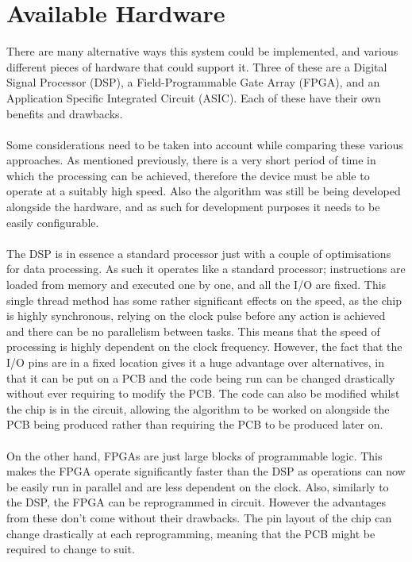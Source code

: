 \section{Available Hardware}
There are many alternative ways this system could be implemented, and various different pieces of hardware that could support it.
Three of these are a Digital Signal Processor (DSP), a Field-Programmable Gate Array (FPGA), and an Application Specific Integrated Circuit (ASIC).
Each of these have their own benefits and drawbacks.
\\
\\
Some considerations need to be taken into account while comparing these various approaches.
As mentioned previously, there is a very short period of time in which the processing can be achieved, therefore the device must be able to operate at a suitably high speed.
Also the algorithm was still be being developed alongside the hardware, and as such for development purposes it needs to be easily configurable.
\\
\\
The DSP is in essence a standard processor just with a couple of optimisations for data processing. 
As such it operates like a standard processor; instructions are loaded from memory and executed one by one, and all the I/O are fixed.
This single thread method has some rather significant effects on the speed, as the chip is highly synchronous, relying on the clock pulse before any action is achieved and there can be no parallelism between tasks.
This means that the speed of processing is highly dependent on the clock frequency.
However, the fact that the I/O pins are in a fixed location gives it a huge advantage over alternatives, in that it can be put on a PCB and the code being run can be changed drastically without ever requiring to modify the PCB.
The code can also be modified whilst the chip is in the circuit, allowing the algorithm to be worked on alongside the PCB being produced rather than requiring the PCB to be produced later on.
\\
\\
On the other hand, FPGAs are just large blocks of programmable logic.
This makes the FPGA operate significantly faster than the DSP as operations can now be easily run in parallel and are less dependent on the clock.
Also, similarly to the DSP, the FPGA can be reprogrammed in circuit.
However the advantages from these don't come without their drawbacks.
The pin layout of the chip can change drastically at each reprogramming, meaning that the PCB might be required to change to suit.
